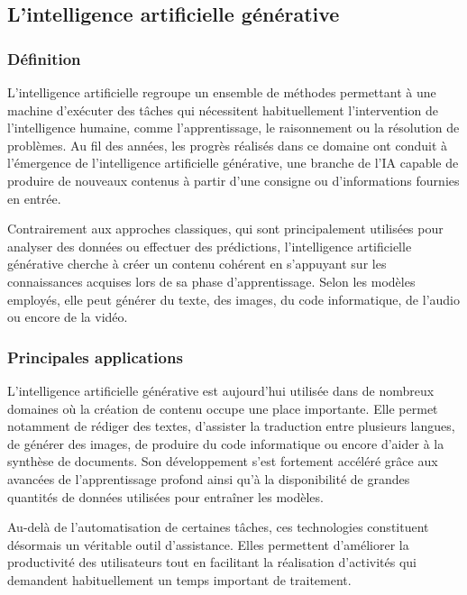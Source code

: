 \subsection{L'intelligence artificielle générative}

\subsubsection{Définition}

L'intelligence artificielle regroupe un ensemble de méthodes permettant à une machine d'exécuter des tâches qui nécessitent habituellement l'intervention de l'intelligence humaine, comme l'apprentissage, le raisonnement ou la résolution de problèmes. Au fil des années, les progrès réalisés dans ce domaine ont conduit à l'émergence de l'intelligence artificielle générative, une branche de l'IA capable de produire de nouveaux contenus à partir d'une consigne ou d'informations fournies en entrée.

Contrairement aux approches classiques, qui sont principalement utilisées pour analyser des données ou effectuer des prédictions, l'intelligence artificielle générative cherche à créer un contenu cohérent en s'appuyant sur les connaissances acquises lors de sa phase d'apprentissage. Selon les modèles employés, elle peut générer du texte, des images, du code informatique, de l'audio ou encore de la vidéo.

\subsubsection{Principales applications}

L'intelligence artificielle générative est aujourd'hui utilisée dans de nombreux domaines où la création de contenu occupe une place importante. Elle permet notamment de rédiger des textes, d'assister la traduction entre plusieurs langues, de générer des images, de produire du code informatique ou encore d'aider à la synthèse de documents. Son développement s'est fortement accéléré grâce aux avancées de l'apprentissage profond ainsi qu'à la disponibilité de grandes quantités de données utilisées pour entraîner les modèles.

Au-delà de l'automatisation de certaines tâches, ces technologies constituent désormais un véritable outil d'assistance. Elles permettent d'améliorer la productivité des utilisateurs tout en facilitant la réalisation d'activités qui demandent habituellement un temps important de traitement.


